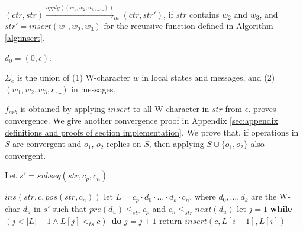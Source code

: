 \begin{itemize}
{\item[-] $(\mathit{ctr},\mathit{str}) \xrightarrow{\mathit{apply}((w_1,w_2,w_3,\_,\_))}_m (\mathit{ctr},\mathit{str}')$, if $\mathit{str}$ contains $w_2$ and $w_3$, and $\mathit{str}' = \mathit{insert}(w_1,w_2,w_3)$ for the recursive function defined in Algorithm \ref{alg:insert}.
}

\item[-] $d_0 = (0,\epsilon)$.

\item[-] $\Sigma_e$ is the union of (1) W-character $w$ in local states and messages, and (2) $(w_1,w_2,w_3,r,\_)$ in messages. 

\item[-] {\color {red}$f_{arb}$ is obtained by applying $\mathit{insert}$ to all W-character in $\mathit{str}$ from $\epsilon$. \cite{Oster:2006} proves convergence. We give another convergence proof in Appendix \ref{sec:appendix definitions and proofs of section implementation}. We prove that, if operations in $S$ are convergent and $o_1$, $o_2$ replies on $S$, then applying $S \cup \{ o_1,o_2 \}$ also convergent.} 

    
    
\end{itemize} 

\begin{algorithm}[t]

Let $s' = \mathit{subseq}(\mathit{str},c_p,c_n)$ \;

{
    \Return $\mathit{ins}(\mathit{str},c,\mathit{pos}(\mathit{str},c_n))$\;
}
\Else
{
    let $L = c_p \cdot d_0 \cdot \ldots \cdot d_k \cdot c_n$, where $d_0,\ldots,d_k$ are the W-char $d_u$ in $s'$ such that $\mathit{pre}(d_u) \leq_{\mathit{str}} c_p$ and $c_n \leq_{\mathit{str}} \mathit{next}(d_u)$\;
    let $j = 1$\;
    {\bf while} $(j < \vert L \vert -1 \wedge L[j] <_{\mathit{ts}} c)$\ {\bf do}
    {
        $j = j+1$\;
    }
    return $\mathit{insert}(c,L[i-1],L[i])$\;
}
\caption{$\mathit{insert}$}
\label{alg:insert}
\end{algorithm} 


















